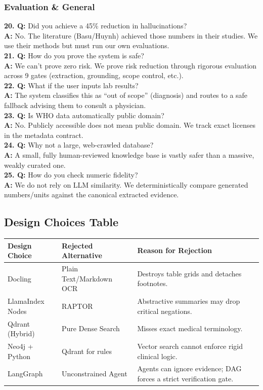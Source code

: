 \documentclass[11pt,a4paper]{article}
\begin{document}
\subsubsection{Evaluation \& General}
\textbf{20. Q:} Did you achieve a 45\% reduction in hallucinations? \\
\textbf{A:} No. The literature (Basu/Huynh) achieved those numbers in their studies. We use their methods but must run our own evaluations. \\
\textbf{21. Q:} How do you prove the system is safe? \\
\textbf{A:} We can't prove zero risk. We prove risk reduction through rigorous evaluation across 9 gates (extraction, grounding, scope control, etc.). \\
\textbf{22. Q:} What if the user inputs lab results? \\
\textbf{A:} The system classifies this as ``out of scope'' (diagnosis) and routes to a safe fallback advising them to consult a physician. \\
\textbf{23. Q:} Is WHO data automatically public domain? \\
\textbf{A:} No. Publicly accessible does not mean public domain. We track exact licenses in the metadata contract. \\
\textbf{24. Q:} Why not a large, web-crawled database? \\
\textbf{A:} A small, fully human-reviewed knowledge base is vastly safer than a massive, weakly curated one. \\
\textbf{25. Q:} How do you check numeric fidelity? \\
\textbf{A:} We do not rely on LLM similarity. We deterministically compare generated numbers/units against the canonical extracted evidence.

\subsection{Design Choices Table}
\begin{table}[ht]
\centering
\begin{tabularx}{\textwidth}{lXX}
\toprule
\textbf{Design Choice} & \textbf{Rejected Alternative} & \textbf{Reason for Rejection} \\
\midrule
Docling & Plain Text/Markdown OCR & Destroys table grids and detaches footnotes. \\
LlamaIndex Nodes & RAPTOR & Abstractive summaries may drop critical negations. \\
Qdrant (Hybrid) & Pure Dense Search & Misses exact medical terminology. \\
Neo4j + Python & Qdrant for rules & Vector search cannot enforce rigid clinical logic. \\
LangGraph & Unconstrained Agent & Agents can ignore evidence; DAG forces a strict verification gate. \\
\bottomrule
\end{tabularx}
\end{table}
\end{document}

